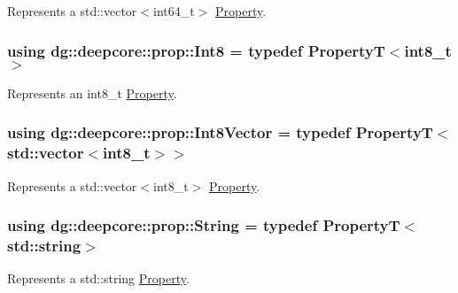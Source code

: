 Represents a {\ttfamily std\+::vector$<$int64\+\_\+t$>$} \hyperlink{classdg_1_1deepcore_1_1_property}{Property}. 

\subsubsection[{\texorpdfstring{Int8}{Int8}}]{\setlength{\rightskip}{0pt plus 5cm}using {\bf dg\+::deepcore\+::prop\+::\+Int8} = typedef PropertyT$<$int8\+\_\+t$>$}\hypertarget{group___process_properties_gabc81c32ee6c2b6a9b8d3dead18f3d336}{}\label{group___process_properties_gabc81c32ee6c2b6a9b8d3dead18f3d336}


Represents an {\ttfamily int8\+\_\+t} \hyperlink{classdg_1_1deepcore_1_1_property}{Property}. 

\subsubsection[{\texorpdfstring{Int8\+Vector}{Int8Vector}}]{\setlength{\rightskip}{0pt plus 5cm}using {\bf dg\+::deepcore\+::prop\+::\+Int8\+Vector} = typedef PropertyT$<$std\+::vector$<$int8\+\_\+t$>$$>$}\hypertarget{group___process_properties_ga4992e9dee24d17c26fa3e61ed758cdfd}{}\label{group___process_properties_ga4992e9dee24d17c26fa3e61ed758cdfd}


Represents a {\ttfamily std\+::vector$<$int8\+\_\+t$>$} \hyperlink{classdg_1_1deepcore_1_1_property}{Property}. 

\subsubsection[{\texorpdfstring{String}{String}}]{\setlength{\rightskip}{0pt plus 5cm}using {\bf dg\+::deepcore\+::prop\+::\+String} = typedef PropertyT$<$std\+::string$>$}\hypertarget{group___process_properties_ga4e7e285652391b247ecc3a1487d234e6}{}\label{group___process_properties_ga4e7e285652391b247ecc3a1487d234e6}


Represents a {\ttfamily std\+::string} \hyperlink{classdg_1_1deepcore_1_1_property}{Property}. 

